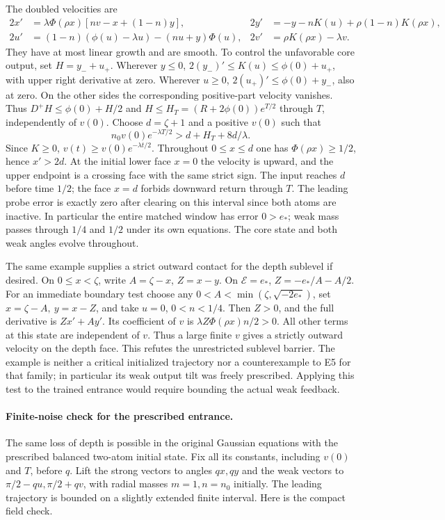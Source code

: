 \documentclass[11pt]{article}
\begin{document}
The doubled velocities are
\begin{align*}
 2x'&=\lambda\Phi(\rho x)[nv-x+(1-n)y],&
 2y'&=-y-nK(u)+\rho(1-n)K(\rho x),\\
 2u'&=(1-n)(\phi(u)-\lambda u)-(nu+y)\Phi(u),&
 2v'&=\rho K(\rho x)-\lambda v .
\end{align*}
They have at most linear growth and are smooth. To control the
unfavorable core output, set $H=y_-+u_+$. Wherever $y\le0$,
$2(y_-)'\le K(u)\le\phi(0)+u_+$, with upper right derivative
at zero. Wherever $u\ge0$, $2(u_+)'\le\phi(0)+y_-$, also at
zero. On the other sides the corresponding positive-part velocity
vanishes. Thus $D^+H\le\phi(0)+H/2$ and
$H\le H_T=(R+2\phi(0))e^{T/2}$ through $T$, independently of $v(0)$.
Choose $d=\zeta+1$ and a positive $v(0)$ such that
\[
 n_0v(0)e^{-\lambda T/2}>d+H_T+8d/\lambda .
\]
Since $K\ge0$, $v(t)\ge v(0)e^{-\lambda t/2}$. Throughout
$0\le x\le d$ one has $\Phi(\rho x)\ge1/2$, hence $x'>2d$.
At the initial lower face $x=0$ the velocity is upward, and the
upper endpoint is a crossing face with the same strict sign.
The input reaches $d$ before time $1/2$; the face $x=d$ forbids
downward return through $T$. The leading probe error is exactly zero
after clearing on this interval since both atoms are inactive.
In particular the entire matched window has error $0>e_*$; weak
mass passes through $1/4$ and $1/2$ under its own equations.
The core state and both weak angles evolve throughout.

The same example supplies a strict outward contact for the
depth sublevel if desired. On $0\le x<\zeta$, write
$A=\zeta-x$, $Z=x-y$. On $\mathcal E=e_*$,
$Z=-e_*/A-A/2$. For an immediate boundary test choose any
$0<A<\min(\zeta,\sqrt{-2e_*})$, set $x=\zeta-A,\ y=x-Z$,
and take $u=0$, $0<n<1/4$. Then $Z>0$, and the full derivative
is $Zx'+Ay'$. Its coefficient of $v$ is
$\lambda Z\Phi(\rho x)n/2>0$. All other terms at this state are
independent of $v$. Thus a large finite $v$ gives a strictly outward
velocity on the depth face. This refutes the unrestricted sublevel
barrier. The example is neither a critical initialized trajectory
nor a counterexample to E5 for that family; in particular its
weak output tilt was freely prescribed. Applying this test to the
trained entrance would require bounding the actual weak feedback.

\paragraph{Finite-noise check for the prescribed entrance.}
The same loss of depth is possible in the original Gaussian
equations with the prescribed balanced two-atom initial state.
Fix all its constants, including $v(0)$ and $T$, before $q$.
Lift the strong vectors to angles $qx,qy$ and the weak vectors to
$\pi/2-qu,\pi/2+qv$, with radial masses $m=1,n=n_0$ initially.
The leading trajectory is bounded on a slightly extended finite interval.
Here is the compact field check.
\end{document}
